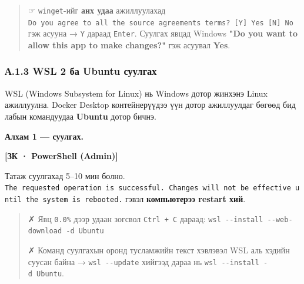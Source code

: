 \begin{Shaded}
\begin{Highlighting}[]
\end{Highlighting}
\end{Shaded}

\begin{quote}
☞ \texttt{winget}-ийг \textbf{анх удаа} ажиллуулахад \texttt{Do\ you\ agree\ to\ all\ the\ source\ agreements\ terms?\allowbreak{}\ {[}Y{]}\ Yes\ {[}N{]}\ No} гэж асууна → \texttt{Y} дараад \texttt{Enter}. Суулгах явцад Windows \textbf{"Do you want to allow this app to make changes?"} гэж асуувал \textbf{Yes}.
\end{quote}

\hypertarget{ux430.1.3-wsl-2-ux431ux430-ubuntu-ux441ux443ux443ux43bux433ux430ux445}{%
\subsubsection{А.1.3 WSL 2 ба Ubuntu суулгах}\label{ux430.1.3-wsl-2-ux431ux430-ubuntu-ux441ux443ux443ux43bux433ux430ux445}}

WSL (Windows Subsystem for Linux) нь Windows дотор жинхэнэ Linux ажиллуулна. Docker Desktop контейнерүүдээ үүн дотор ажиллуулдаг бөгөөд бид лабын командуудаа \textbf{Ubuntu} дотор бичнэ.

\textbf{Алхам 1 --- суулгах.}

\textbf{{[}ЗК · PowerShell (Admin){]}}

\begin{Shaded}
\begin{Highlighting}[]
\end{Highlighting}
\end{Shaded}

Татаж суулгахад 5--10 мин болно. \texttt{The\ requested\ operation\ is\ successful.\allowbreak{}\ Changes\ will\ not\ be\ effective\ until\ the\ system\ is\ rebooted.\allowbreak{}} гэвэл \textbf{компьютерээ restart хий}.

\begin{quote}
✗ Явц \texttt{0.0\%} дээр удаан зогсвол \texttt{Ctrl\ +\ C} дараад: \texttt{wsl\ -\/\allowbreak{}-install\ -\/\allowbreak{}-web-download\ -d\ Ubuntu}

✗ Команд суулгахын оронд тусламжийн текст хэвлэвэл WSL аль хэдийн суусан байна → \texttt{wsl\ -\/-update} хийгээд дараа нь \texttt{wsl\ -\/\allowbreak{}-install\ -d\ Ubuntu}.
\end{quote}

